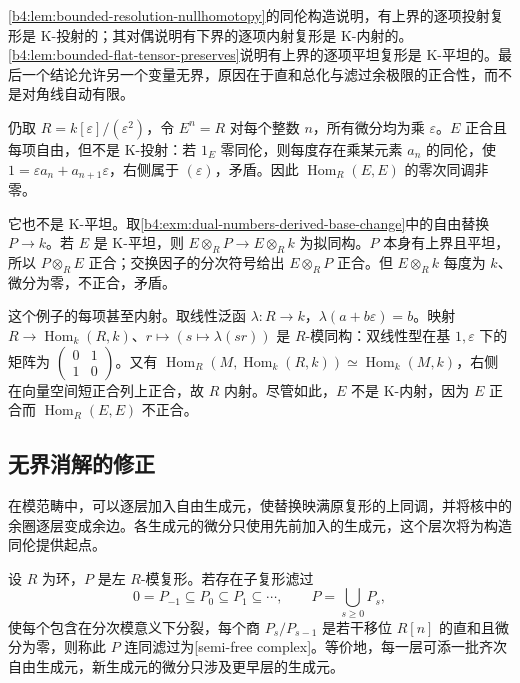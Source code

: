 \ProseParagraphBreak
\cref{b4:lem:bounded-resolution-nullhomotopy}的同伦构造说明，有上界的逐项投射复形是 K-投射的；其对偶说明有下界的逐项内射复形是 K-内射的。\cref{b4:lem:bounded-flat-tensor-preserves}说明有上界的逐项平坦复形是 K-平坦的。最后一个结论允许另一个变量无界，原因在于直和总化与滤过余极限的正合性，而不是对角线自动有限。

\begin{example}\label{b4:exm:unbounded-free-not-k-projective}
	仍取 \(R=k[\varepsilon]/(\varepsilon^2)\)，令 \(E^n=R\) 对每个整数 \(n\)，所有微分均为乘 \(\varepsilon\)。\(E\) 正合且每项自由，但不是 K-投射：若 \(1_E\) 零同伦，则每度存在乘某元素 \(a_n\) 的同伦，使 \(1=\varepsilon a_n+a_{n+1}\varepsilon\)，右侧属于 \((\varepsilon)\)，矛盾。因此 \(\operatorname{Hom}_R(E,E)\) 的零次同调非零。

	\ProseParagraphBreak
	它也不是 K-平坦。取\cref{b4:exm:dual-numbers-derived-base-change}中的自由替换 \(P\to k\)。若 \(E\) 是 K-平坦，则 \(E\otimes_RP\to E\otimes_Rk\) 为拟同构。\(P\) 本身有上界且平坦，所以 \(P\otimes_RE\) 正合；交换因子的分次符号给出 \(E\otimes_RP\) 正合。但 \(E\otimes_Rk\) 每度为 \(k\)、微分为零，不正合，矛盾。

	\ProseParagraphBreak
	这个例子的每项甚至内射。取线性泛函 \(\lambda:R\to k\)，\(\lambda(a+b\varepsilon)=b\)。映射 \(R\to\operatorname{Hom}_k(R,k)\)、\(r\mapsto(s\mapsto\lambda(sr))\)
	是 \(R\)-模同构：双线性型在基 \(1,\varepsilon\) 下的矩阵为 \(\left(\begin{smallmatrix}0&1\\1&0\end{smallmatrix}\right)\)。又有
	\(\operatorname{Hom}_R(M,\operatorname{Hom}_k(R,k))\simeq\operatorname{Hom}_k(M,k)\)，右侧在向量空间短正合列上正合，故 \(R\) 内射。尽管如此，\(E\) 不是 K-内射，因为 \(E\) 正合而 \(\operatorname{Hom}_R(E,E)\) 不正合。
\end{example}

\subsection{无界消解的修正}
\label{b4:subsec:1804:02}

在模范畴中，可以逐层加入自由生成元，使替换映满原复形的上同调，并将核中的余圈逐层变成余边。各生成元的微分只使用先前加入的生成元，这个层次将为构造同伦提供起点。

\begin{definition}\label{b4:def:semifree-complex}
	设 \(R\) 为环，\(P\) 是左 \(R\)-模复形。若存在子复形滤过
	\[
		0=P_{-1}\subseteq P_0\subseteq P_1\subseteq\cdots, \qquad P=\bigcup_{s\ge0}P_s,
	\]
	使每个包含在分次模意义下分裂，每个商 \(P_s/P_{s-1}\) 是若干移位 \(R[n]\) 的直和且微分为零，则称此 \(P\) 连同滤过为[semi-free complex]。等价地，每一层可添一批齐次自由生成元，新生成元的微分只涉及更早层的生成元。
\end{definition}

